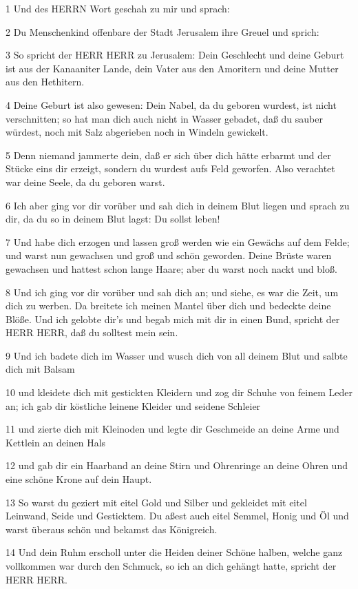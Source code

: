 \par 1 Und des HERRN Wort geschah zu mir und sprach:
\par 2 Du Menschenkind offenbare der Stadt Jerusalem ihre Greuel und sprich:
\par 3 So spricht der HERR HERR zu Jerusalem: Dein Geschlecht und deine Geburt ist aus der Kanaaniter Lande, dein Vater aus den Amoritern und deine Mutter aus den Hethitern.
\par 4 Deine Geburt ist also gewesen: Dein Nabel, da du geboren wurdest, ist nicht verschnitten; so hat man dich auch nicht in Wasser gebadet, daß du sauber würdest, noch mit Salz abgerieben noch in Windeln gewickelt.
\par 5 Denn niemand jammerte dein, daß er sich über dich hätte erbarmt und der Stücke eins dir erzeigt, sondern du wurdest aufs Feld geworfen. Also verachtet war deine Seele, da du geboren warst.
\par 6 Ich aber ging vor dir vorüber und sah dich in deinem Blut liegen und sprach zu dir, da du so in deinem Blut lagst: Du sollst leben!
\par 7 Und habe dich erzogen und lassen groß werden wie ein Gewächs auf dem Felde; und warst nun gewachsen und groß und schön geworden. Deine Brüste waren gewachsen und hattest schon lange Haare; aber du warst noch nackt und bloß.
\par 8 Und ich ging vor dir vorüber und sah dich an; und siehe, es war die Zeit, um dich zu werben. Da breitete ich meinen Mantel über dich und bedeckte deine Blöße. Und ich gelobte dir's und begab mich mit dir in einen Bund, spricht der HERR HERR, daß du solltest mein sein.
\par 9 Und ich badete dich im Wasser und wusch dich von all deinem Blut und salbte dich mit Balsam
\par 10 und kleidete dich mit gestickten Kleidern und zog dir Schuhe von feinem Leder an; ich gab dir köstliche leinene Kleider und seidene Schleier
\par 11 und zierte dich mit Kleinoden und legte dir Geschmeide an deine Arme und Kettlein an deinen Hals
\par 12 und gab dir ein Haarband an deine Stirn und Ohrenringe an deine Ohren und eine schöne Krone auf dein Haupt.
\par 13 So warst du geziert mit eitel Gold und Silber und gekleidet mit eitel Leinwand, Seide und Gesticktem. Du aßest auch eitel Semmel, Honig und Öl und warst überaus schön und bekamst das Königreich.
\par 14 Und dein Ruhm erscholl unter die Heiden deiner Schöne halben, welche ganz vollkommen war durch den Schmuck, so ich an dich gehängt hatte, spricht der HERR HERR.
